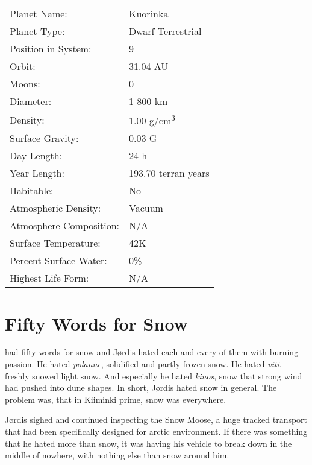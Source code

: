 \documentclass{tufte-book}
\begin{document}
\bigskip
\begin{minipage}{\textwidth}
\begin{center}
\begin{tabular}{ll}
\toprule
Planet Name: & Kuorinka \\
Planet Type: & Dwarf Terrestrial \\
Position in System: & 9 \\
Orbit: & 31.04 AU \\
Moons: & 0 \\
Diameter: & 1 800 km \\
Density: & 1.00 g/cm\textsuperscript{3} \\
Surface Gravity: & 0.03 G \\
Day Length: & 24 h \\
Year Length: & 193.70 terran years \\
Habitable: & No \\
\quad Atmospheric Density: & Vacuum \\
\quad Atmosphere Composition: & N/A \\
\quad Surface Temperature: & 42K \\
\quad Percent Surface Water: & 0\% \\
\quad Highest Life Form: & N/A \\

\bottomrule
\end{tabular}
\end{center}
\end{minipage}

\clearpage

\chapter{Fifty Words for Snow}

 had fifty words for snow and
J\o rdis hated each and every of them with burning passion. He hated
\emph{polanne}, solidified and partly frozen snow. He hated \emph{viti}, 
freshly snowed light snow. And especially he hated \emph{kinos}, snow 
that strong wind had pushed into dune shapes. In short, J\o rdis hated 
snow in general. The problem was, that in Kiiminki prime, snow was 
everywhere.

J\o rdis sighed and continued inspecting the Snow Moose, a huge
tracked transport that had been specifically designed for arctic
environment. If there was something that he hated more than snow, it
was having his vehicle to break down in the middle of nowhere, with
nothing else than snow around him.
\end{document}
